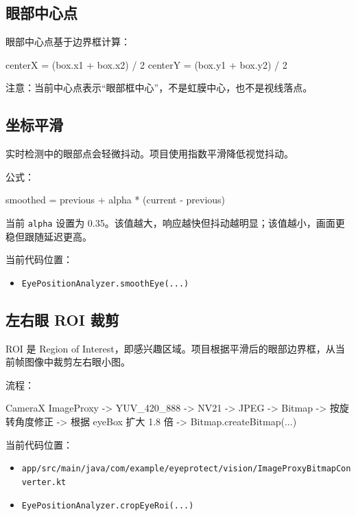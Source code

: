 \documentclass[UTF8,a4paper,11pt]{ctexart}
\begin{document}
\subsection{眼部中心点}

眼部中心点基于边界框计算：

\begin{code}
centerX = (box.x1 + box.x2) / 2
centerY = (box.y1 + box.y2) / 2
\end{code}

注意：当前中心点表示“眼部框中心”，不是虹膜中心，也不是视线落点。

\subsection{坐标平滑}

实时检测中的眼部点会轻微抖动。项目使用指数平滑降低视觉抖动。

公式：

\begin{code}
smoothed = previous + alpha * (current - previous)
\end{code}

当前 \texttt{alpha} 设置为 0.35。该值越大，响应越快但抖动越明显；该值越小，画面更稳但跟随延迟更高。

当前代码位置：

\begin{itemize}
  \item \texttt{EyePositionAnalyzer.smoothEye(...)}
\end{itemize}

\subsection{左右眼 ROI 裁剪}

ROI 是 Region of Interest，即感兴趣区域。项目根据平滑后的眼部边界框，从当前帧图像中裁剪左右眼小图。

流程：

\begin{code}
CameraX ImageProxy
  -> YUV_420_888
  -> NV21
  -> JPEG
  -> Bitmap
  -> 按旋转角度修正
  -> 根据 eyeBox 扩大 1.8 倍
  -> Bitmap.createBitmap(...)
\end{code}

当前代码位置：

\begin{itemize}
  \item \texttt{app/src/main/java/com/example/eyeprotect/vision/ImageProxyBitmapConverter.kt}
  \item \texttt{EyePositionAnalyzer.cropEyeRoi(...)}
\end{itemize}
\end{document}

